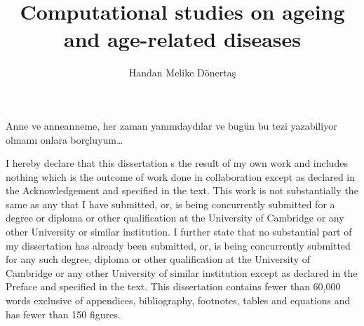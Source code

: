 \documentclass[12pt,twoside]{unicam}
\title{Computational studies on ageing and age-related diseases}
\author{Handan Melike Dönertaş}
\subtitle{}
\date{}
\begin{document}
  \maketitle

\frontmatter %
\pagestyle{empty} %

  \begin{dedication}
    Anne ve anneanneme, her zaman yanımdaydılar ve bugün bu tezi yazabiliyor olmamı onlara borçluyum\ldots{}
  \end{dedication}

  \begin{declaration}
    I hereby declare that this dissertation s the result of my own work and includes nothing which is the outcome of work done in collaboration except as declared in the Acknowledgement and specified in the text. This work is not substantially the same as any that I have submitted, or, is being concurrently submitted for a degree or diploma or other qualification at the University of Cambridge or any other University or similar institution. I further state that no substantial part of my dissertation has already been submitted, or, is being concurrently submitted for any such degree, diploma or other qualification at the University of Cambridge or any other University of similar institution except as declared in the Preface and specified in the text. This dissertation contains fewer than 60,000 words exclusive of appendices, bibliography, footnotes, tables and equations and has fewer than 150 figures.
  \end{declaration}
\end{document}
